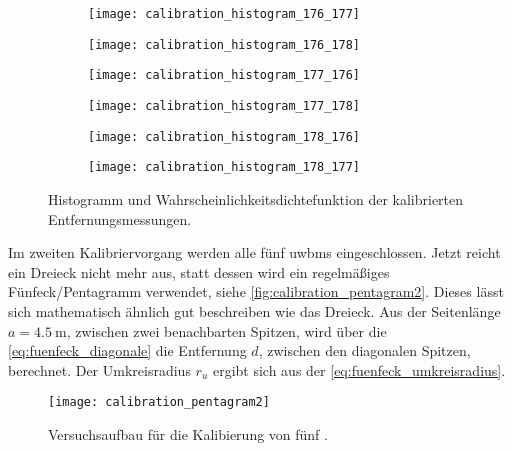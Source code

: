 \begin{figure}
	\centering
	\begin{subfigure}[b]{0.32\linewidth}
		\centering
		\texttt{[image: calibration\_histogram\_176\_177]}
	\end{subfigure}
	\hfill
	\begin{subfigure}[b]{0.32\linewidth}
		\centering
		\texttt{[image: calibration\_histogram\_176\_178]}
	\end{subfigure}
	\hfill
	\begin{subfigure}[b]{0.32\linewidth}
		\centering
		\texttt{[image: calibration\_histogram\_177\_176]}
	\end{subfigure}
	\par
	\bigskip
	\begin{subfigure}[b]{0.32\linewidth}
		\centering
		\texttt{[image: calibration\_histogram\_177\_178]}
	\end{subfigure}
	\hfill
	\begin{subfigure}[b]{0.32\linewidth}
		\centering
		\texttt{[image: calibration\_histogram\_178\_176]}
	\end{subfigure}
	\hfill
	\begin{subfigure}[b]{0.32\linewidth}
		\centering
		\texttt{[image: calibration\_histogram\_178\_177]}
	\end{subfigure}
	\caption{Histogramm und Wahrscheinlichkeitsdichtefunktion der kalibrierten Entfernungsmessungen.}
	\label{fig:calibration_histograms}
\end{figure}

Im zweiten Kalibriervorgang werden alle fünf \Glspl{uwbm} eingeschlossen. Jetzt reicht ein Dreieck nicht mehr aus, statt dessen wird ein regelmäßiges Fünfeck/Pentagramm verwendet, siehe \autoref{fig:calibration_pentagram2}. Dieses lässt sich mathematisch ähnlich gut beschreiben wie das Dreieck. Aus der Seitenlänge $a = \SI{4.5}{\meter}$, zwischen zwei benachbarten Spitzen, wird über die \autoref{eq:fuenfeck_diagonale} die Entfernung $d$, zwischen den diagonalen Spitzen, berechnet. Der Umkreisradius $r_u$ ergibt sich aus der \autoref{eq:fuenfeck_umkreisradius}.

\begin{figure}
	\centering
	\texttt{[image: calibration\_pentagram2]}
	\caption{Versuchsaufbau für die Kalibierung von fünf .}
	\label{fig:calibration_pentagram2}
\end{figure}

